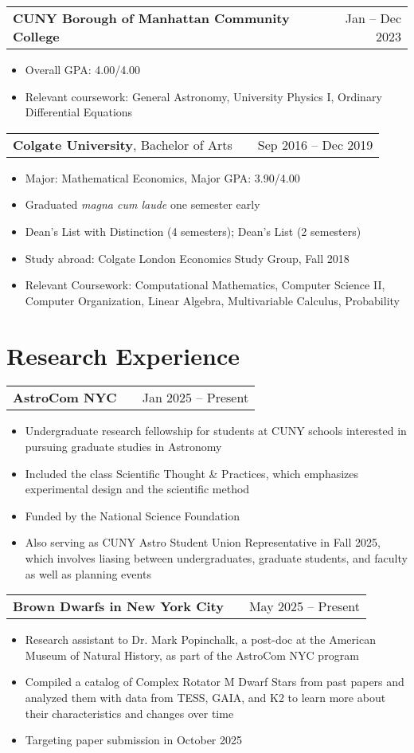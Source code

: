 \documentclass[a4paper,12pt]{article}
\makeatletter
\newenvironment{joblong}[2]
    {
    \begin{tabularx}{\linewidth}{@{}l X r@{}}
    #1 & \hfill &  #2 \\[3.75pt]
    \end{tabularx}
    \begin{minipage}[t]{\linewidth}
    \begin{itemize}[nosep,after=\strut, leftmargin=1em, itemsep=3pt,label=--]
    }
    {
    \end{itemize}
    \end{minipage}    
    }
\makeatother
\begin{document}
\begin{joblong}{\textbf{CUNY Borough of Manhattan Community College}}{Jan -- Dec 2023}
\item Overall GPA: 4.00/4.00
\item Relevant coursework: General Astronomy, University Physics I, Ordinary Differential Equations
\end{joblong}

\begin{joblong}{\textbf{Colgate University}, Bachelor of Arts}{Sep 2016 -- Dec 2019}
\item Major: Mathematical Economics, Major GPA: 3.90/4.00
\item Graduated \textit{magna cum laude} one semester early
\item Dean's List with Distinction (4 semesters); Dean's List (2 semesters)
\item Study abroad: Colgate London Economics Study Group, Fall 2018
\item Relevant Coursework: Computational Mathematics, Computer Science II, Computer Organization, Linear Algebra, Multivariable Calculus, Probability
\end{joblong}


\section{Research Experience}

\begin{joblong}{\textbf{AstroCom NYC}}{Jan 2025 -- Present}
\item Undergraduate research fellowship for students at CUNY schools interested in pursuing graduate studies in Astronomy
\item Included the class Scientific Thought \& Practices, which emphasizes experimental design and the scientific method
\item Funded by the National Science Foundation
\item Also serving as CUNY Astro Student Union Representative in Fall 2025, which involves liasing between undergraduates, graduate students, and faculty as well as planning events
\end{joblong}

\begin{joblong}{\textbf{Brown Dwarfs in New York City}}{May 2025 -- Present}
\item Research assistant to Dr. Mark Popinchalk, a post-doc at the American Museum of Natural History, as part of the AstroCom NYC program
\item Compiled a catalog of Complex Rotator M Dwarf Stars from past papers and analyzed them with data from TESS, GAIA, and K2 to learn more about their characteristics and changes over time
\item Targeting paper submission in October 2025
\end{joblong}
\end{document}
